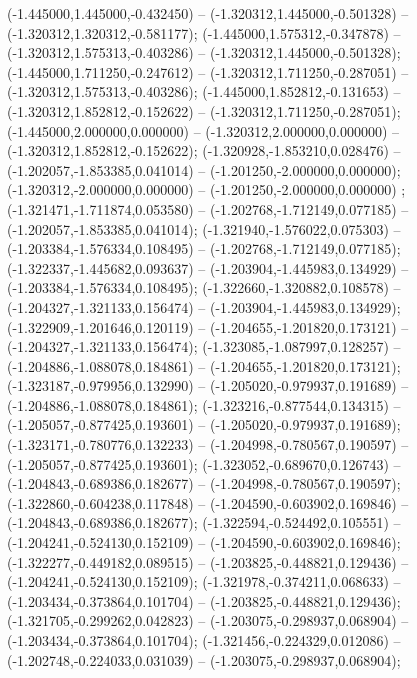  (-1.445000,1.445000,-0.432450) -- (-1.320312,1.445000,-0.501328) -- (-1.320312,1.320312,-0.581177);
 (-1.445000,1.575312,-0.347878) -- (-1.320312,1.575313,-0.403286) -- (-1.320312,1.445000,-0.501328);
 (-1.445000,1.711250,-0.247612) -- (-1.320312,1.711250,-0.287051) -- (-1.320312,1.575313,-0.403286);
 (-1.445000,1.852812,-0.131653) -- (-1.320312,1.852812,-0.152622) -- (-1.320312,1.711250,-0.287051);
 (-1.445000,2.000000,0.000000) -- (-1.320312,2.000000,0.000000) -- (-1.320312,1.852812,-0.152622);
 (-1.320928,-1.853210,0.028476) -- (-1.202057,-1.853385,0.041014) -- (-1.201250,-2.000000,0.000000);
 (-1.320312,-2.000000,0.000000) -- (-1.201250,-2.000000,0.000000) ;
 (-1.321471,-1.711874,0.053580) -- (-1.202768,-1.712149,0.077185) -- (-1.202057,-1.853385,0.041014);
 (-1.321940,-1.576022,0.075303) -- (-1.203384,-1.576334,0.108495) -- (-1.202768,-1.712149,0.077185);
 (-1.322337,-1.445682,0.093637) -- (-1.203904,-1.445983,0.134929) -- (-1.203384,-1.576334,0.108495);
 (-1.322660,-1.320882,0.108578) -- (-1.204327,-1.321133,0.156474) -- (-1.203904,-1.445983,0.134929);
 (-1.322909,-1.201646,0.120119) -- (-1.204655,-1.201820,0.173121) -- (-1.204327,-1.321133,0.156474);
 (-1.323085,-1.087997,0.128257) -- (-1.204886,-1.088078,0.184861) -- (-1.204655,-1.201820,0.173121);
 (-1.323187,-0.979956,0.132990) -- (-1.205020,-0.979937,0.191689) -- (-1.204886,-1.088078,0.184861);
 (-1.323216,-0.877544,0.134315) -- (-1.205057,-0.877425,0.193601) -- (-1.205020,-0.979937,0.191689);
 (-1.323171,-0.780776,0.132233) -- (-1.204998,-0.780567,0.190597) -- (-1.205057,-0.877425,0.193601);
 (-1.323052,-0.689670,0.126743) -- (-1.204843,-0.689386,0.182677) -- (-1.204998,-0.780567,0.190597);
 (-1.322860,-0.604238,0.117848) -- (-1.204590,-0.603902,0.169846) -- (-1.204843,-0.689386,0.182677);
 (-1.322594,-0.524492,0.105551) -- (-1.204241,-0.524130,0.152109) -- (-1.204590,-0.603902,0.169846);
 (-1.322277,-0.449182,0.089515) -- (-1.203825,-0.448821,0.129436) -- (-1.204241,-0.524130,0.152109);
 (-1.321978,-0.374211,0.068633) -- (-1.203434,-0.373864,0.101704) -- (-1.203825,-0.448821,0.129436);
 (-1.321705,-0.299262,0.042823) -- (-1.203075,-0.298937,0.068904) -- (-1.203434,-0.373864,0.101704);
 (-1.321456,-0.224329,0.012086) -- (-1.202748,-0.224033,0.031039) -- (-1.203075,-0.298937,0.068904);
